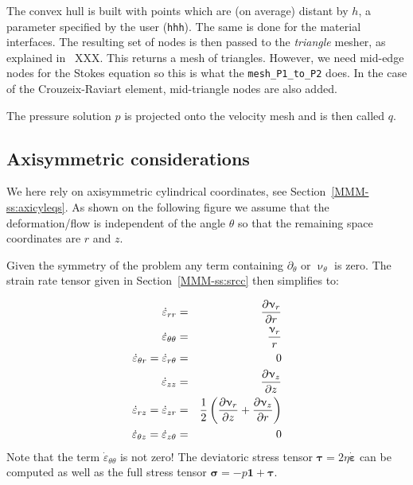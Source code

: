 The convex hull is built with points which are (on average) distant by $h$, 
a parameter specified by the user ({\tt hhh}).
The same is done for the material interfaces. 
The resulting set of nodes is then passed to the {\sl triangle} mesher, as explained 
in \stone~XXX.
This returns a mesh of triangles. However, we need mid-edge nodes for the Stokes equation
so this is what the {\tt mesh\_P1\_to\_P2} does. In the case of the Crouzeix-Raviart element, 
mid-triangle nodes are also added. 


The pressure solution $p$ is projected onto the velocity mesh and is then called $q$.



\subsection*{Axisymmetric considerations}

We here rely on axisymmetric cylindrical coordinates, see Section~\ref{MMM-ss:axicyleqs}.
As shown on the following figure we assume that the deformation/flow is independent of the angle 
$\theta$ so that the remaining space coordinates are $r$ and $z$.
\begin{center}

\end{center}

Given the symmetry of the problem any term containing $\partial_\theta$ or $\upnu_\theta$ is zero.
The strain rate tensor given in Section~\ref{MMM-ss:srcc} then simplifies to:

\begin{eqnarray}
\dot\varepsilon_{rr} 
&=& \frac{\partial \upnu_r}{\partial r} \nonumber\\
\dot\varepsilon_{\theta\theta}  &=& \frac{\upnu_r}{r} \nonumber\\
\dot\varepsilon_{\theta r} = \dot\varepsilon_{r\theta}  &=& 0 \nonumber\\
\dot\varepsilon_{zz} &=& \frac{\partial \upnu_z}{\partial z} \nonumber\\
\dot{\varepsilon}_{rz} = \dot{\varepsilon}_{zr} 
&=& \frac{1}{2}\left( \frac{\partial \upnu_r}{\partial z} + \frac{\partial \upnu_z}{\partial r} \right) \nonumber\\
\dot{\varepsilon}_{\theta z} = \dot{\varepsilon}_{z \theta} &=& 0 \nonumber
\end{eqnarray}
Note that the term $\dot\varepsilon_{\theta\theta} $ is not zero!
The deviatoric stress tensor ${\bm \tau}=2\eta \dot{\bm \varepsilon}$ can be computed
as well as the full stress tensor ${\bm \sigma}=-p {\bm 1} + {\bm \tau}$. 


